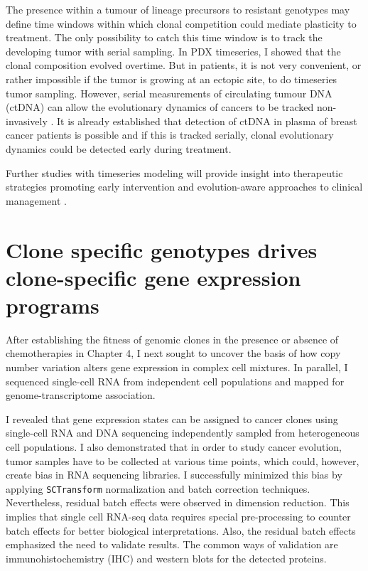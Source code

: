 The presence within a tumour of lineage precursors to resistant genotypes may define time windows within which clonal competition could mediate plasticity to treatment. The only possibility to catch this time window is to track the developing tumor with serial sampling. In PDX timeseries, I showed that the clonal composition evolved overtime. But in patients, it is not very convenient, or rather impossible if the tumor is growing at an ectopic site, to do timeseries tumor sampling. However, serial measurements of circulating tumour DNA (ctDNA) can allow the evolutionary dynamics of cancers to be tracked non-invasively . It is already established that detection of ctDNA in plasma of breast cancer patients is possible \cite{beaver2014detection, garcia2015mutation, merker2018circulating} and if this is tracked serially, clonal evolutionary dynamics could be detected early during treatment.

 Further studies with timeseries modeling will provide insight into therapeutic strategies promoting early intervention and evolution-aware approaches to clinical management \cite{Acar2020-tf}.
 

\section{Clone specific genotypes drives clone-specific gene expression programs}

After establishing the fitness of genomic clones in the presence or absence of chemotherapies in Chapter 4, I next sought to uncover the basis of how copy number variation alters gene expression in complex cell mixtures. In parallel, I sequenced single-cell RNA from independent cell populations and mapped for genome-transcriptome association. 

I revealed that gene expression states can be assigned to cancer clones using single-cell RNA and DNA sequencing independently sampled from heterogeneous cell populations. 
I also demonstrated that in order to study cancer evolution, tumor samples have to be collected at various time points, which could, however, create bias in RNA sequencing libraries. I successfully minimized this bias by applying \texttt{SCTransform} normalization and batch correction techniques. Nevertheless, residual batch effects were observed in dimension reduction. This implies that single cell RNA-seq data requires special pre-processing to counter batch effects for better biological interpretations. Also, the residual batch effects emphasized the need to validate results. The common ways of validation are immunohistochemistry (IHC) and western blots for the detected proteins. 

